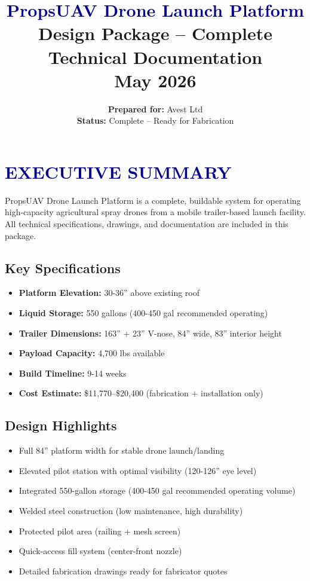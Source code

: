\documentclass[11pt,letter]{article}
\title{
  {\Huge \textbf{\textcolor{darkblue}{PropsUAV Drone Launch Platform}}} \\
  {\Large Design Package -- Complete Technical Documentation} \\
  {\normalsize May 2026}
}
\author{\textbf{Prepared for:} Avest Ltd \\ \textbf{Status:} Complete -- Ready for Fabrication}
\date{}
\begin{document}
\maketitle

\section*{\textcolor{darkblue}{EXECUTIVE SUMMARY}}

PropsUAV Drone Launch Platform is a complete, buildable system for operating high-capacity agricultural spray drones from a mobile trailer-based launch facility. All technical specifications, drawings, and documentation are included in this package.

\subsection*{Key Specifications}
\begin{itemize}
  \item \textbf{Platform Elevation:} 30-36'' above existing roof
  \item \textbf{Liquid Storage:} 550 gallons (400-450 gal recommended operating)
  \item \textbf{Trailer Dimensions:} 163'' + 23'' V-nose, 84'' wide, 83'' interior height
  \item \textbf{Payload Capacity:} 4,700 lbs available
  \item \textbf{Build Timeline:} 9-14 weeks
  \item \textbf{Cost Estimate:} \$11,770--\$20,400 (fabrication + installation only)
\end{itemize}

\subsection*{Design Highlights}
\begin{itemize}
  \item [\checkmark] Full 84'' platform width for stable drone launch/landing
  \item [\checkmark] Elevated pilot station with optimal visibility (120-126'' eye level)
  \item [\checkmark] Integrated 550-gallon storage (400-450 gal recommended operating volume)
  \item [\checkmark] Welded steel construction (low maintenance, high durability)
  \item [\checkmark] Protected pilot area (railing + mesh screen)
  \item [\checkmark] Quick-access fill system (center-front nozzle)
  \item [\checkmark] Detailed fabrication drawings ready for fabricator quotes
\end{itemize}
\end{document}
